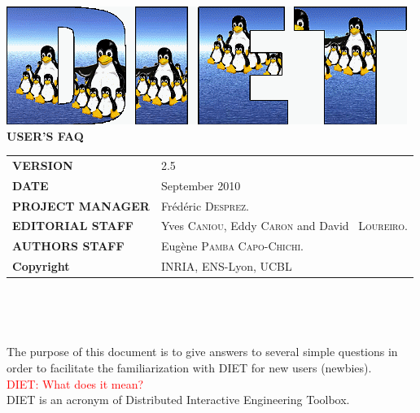 \documentclass[12pt,a4paper]{book}
\newcommand{\dietversion}{2.5}
\begin{document}

\thispagestyle{empty}
\vspace*{3cm}
\vspace*{3cm}

\begin{center}
\includegraphics[scale=.5]{fig/logo_DIET_big}\\[2ex]
\textbf{\Huge USER'S FAQ\\[2ex]}
\end{center}

\vfill

\noindent
\small{
\begin{tabular}{ll}
  \textbf{VERSION}  & \dietversion\\
  \textbf{DATE}     & September 2010\\
  \textbf{PROJECT MANAGER}  & Fr\'ed\'eric \textsc{Desprez}.\\
  \textbf{EDITORIAL STAFF}  & Yves \textsc{Caniou}, Eddy \textsc{Caron} and David ~\textsc{Loureiro}.\\
  \textbf{AUTHORS STAFF}    & 
\begin{minipage}[t]{12cm}
  Eug\`ene \textsc{Pamba Capo-Chichi}.
\end{minipage} \\
  \textbf{Copyright}& INRIA, ENS-Lyon, UCBL
\end{tabular}\\
}

\newpage
\thispagestyle{empty}
\ 



\newpage
\tableofcontents

\setlength{\columnseprule}{1pt}


\noindent The purpose of this document is to give answers to several simple questions in order to facilitate the familiarization with DIET for new users (newbies).\\

\noindent \textcolor{red}{DIET: What does it mean?}\\
DIET is an acronym of Distributed Interactive Engineering Toolbox.\\
\end{document}
